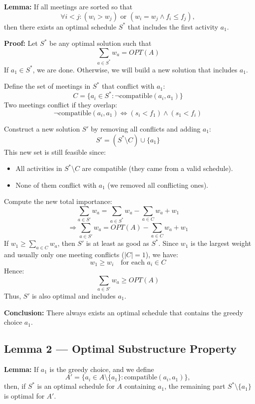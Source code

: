 \documentclass[conference]{IEEEtran}
\begin{document}
\textbf{Lemma:}
If all meetings are sorted so that
\[
\forall i < j : (w_i > w_j) \text{ or } (w_i = w_j \land f_i \le f_j),
\]
then there exists an optimal schedule \( S^* \) that includes the first activity \( a_1 \).

\textbf{Proof:}
Let \( S^* \) be any optimal solution such that
\[
\sum_{a \in S^*} w_a = OPT(A)
\]
If \( a_1 \in S^* \), we are done. Otherwise, we will build a new solution that includes \( a_1 \).

Define the set of meetings in \( S^* \) that conflict with \( a_1 \):
\[
C = \{ a_i \in S^* : \neg \text{compatible}(a_i, a_1) \}
\]
Two meetings conflict if they overlap:
\[
\neg \text{compatible}(a_i, a_1) \iff (s_i < f_1) \wedge (s_1 < f_i)
\]

Construct a new solution \( S' \) by removing all conflicts and adding \( a_1 \):
\[
S' = (S^* \setminus C) \cup \{ a_1 \}
\]
This new set is still feasible since:
\begin{itemize}
    \item All activities in \( S^* \setminus C \) are compatible (they came from a valid schedule).
    \item None of them conflict with \( a_1 \) (we removed all conflicting ones).
\end{itemize}

Compute the new total importance:
\[
\sum_{a \in S'} w_a = \sum_{a \in S^*} w_a - \sum_{a \in C} w_a + w_1
\]
\[
\Rightarrow \sum_{a \in S'} w_a = OPT(A) - \sum_{a \in C} w_a + w_1
\]
If \( w_1 \ge \sum_{a \in C} w_a \), then \( S' \) is at least as good as \( S^* \).  
Since \( w_1 \) is the largest weight and usually only one meeting conflicts (\( |C| = 1 \)), we have:
\[
w_1 \ge w_i \quad \text{for each } a_i \in C
\]
Hence:
\[
\sum_{a \in S'} w_a \ge OPT(A)
\]
Thus, \( S' \) is also optimal and includes \( a_1 \).

\textbf{Conclusion:} There always exists an optimal schedule that contains the greedy choice \( a_1 \).  

\subsection{Lemma 2 — Optimal Substructure Property}

\textbf{Lemma:}
If \( a_1 \) is the greedy choice, and we define
\[
A' = \{ a_i \in A \setminus \{a_1\} : \text{compatible}(a_i, a_1) \},
\]
then, if \( S^* \) is an optimal schedule for \( A \) containing \( a_1 \),  
the remaining part \( S^* \setminus \{a_1\} \) is optimal for \( A' \).
\end{document}
